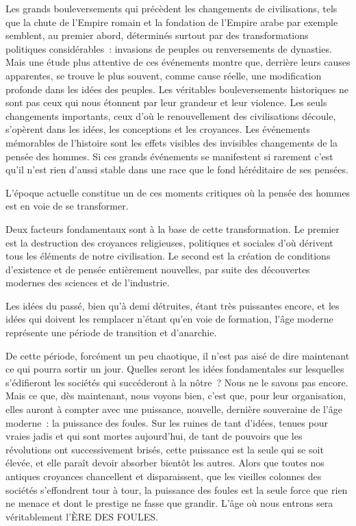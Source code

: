 \documentclass[french,twoside]{book} %
\begin{document}
\noindent Les grands bouleversements qui précèdent les changements de civilisations, tels que la chute de l’Empire romain et la fondation de l’Empire arabe par exemple sem­blent, au premier abord, déterminés surtout par des transformations politiques consi­dérables : invasions de peuples ou renversements de dynasties. Mais une étude plus attentive de ces événements montre que, derrière leurs causes apparentes, se trouve le plus souvent, comme cause réelle, une modification profonde dans les idées des peuples. Les véritables bouleversements historiques ne sont pas ceux qui nous étonnent par leur grandeur et leur violence. Les seuls changements importants, ceux d’où le renouvellement des civilisations découle, s’opèrent dans les idées, les concep­tions et les croyances. Les événements mémorables de l’histoire sont les effets visi­bles des invisibles changements de la pensée des hommes. Si ces grands événements se manifestent si rarement c’est qu’il n’est rien d’aussi stable dans une race que le fond héréditaire de ses pensées.\par
L’époque actuelle constitue un de ces moments critiques où la pensée des hommes est en voie de se transformer.\par
Deux facteurs fondamentaux sont à la base de cette transformation. Le premier est la destruction des croyances religieuses, politiques et sociales d’où dérivent tous les éléments de notre civilisation. Le second est la création de conditions d’existence et de pensée entièrement nouvelles, par suite des découvertes modernes des sciences et de l’industrie.\par
Les idées du passé, bien qu’à demi détruites, étant très puissantes encore, et les idées qui doivent les remplacer n’étant qu’en voie de formation, l’âge moderne repré­sente une période de transition et d’anarchie.\par
De cette période, forcément un peu chaotique, il n’est pas aisé de dire maintenant ce qui pourra sortir un jour. Quelles seront les idées fondamentales sur les­quelles s’édifieront les sociétés qui succéderont à la nôtre ? Nous ne le savons pas encore. Mais ce que, dès maintenant, nous voyons bien, c’est que, pour leur organisation, elles auront à compter avec une puissance, nouvelle, dernière souveraine de l’âge moder­ne : la puissance des foules. Sur les ruines de tant d’idées, tenues pour vraies jadis et qui sont mortes aujourd’hui, de tant de pouvoirs que les révolutions ont successive­ment brisés, cette puissance est la seule qui se soit élevée, et elle paraît devoir absorber bientôt les autres. Alors que toutes nos antiques croyances chancellent et disparaissent, que les vieilles colonnes des sociétés s’effondrent tour à tour, la puissance des foules est la seule force que rien ne menace et dont le prestige ne fasse que grandir. L’âge où nous entrons sera véritablement l’ÈRE DES FOULES.\par
\end{document}
